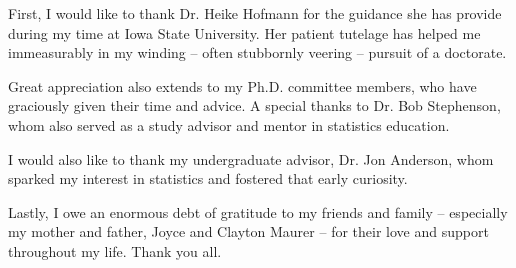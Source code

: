 
First, I would like to thank Dr. Heike Hofmann for the guidance she has provide during my time at Iowa State University. Her patient tutelage has helped me immeasurably in my winding -- often stubbornly veering -- pursuit of a doctorate. 

Great appreciation also extends to my Ph.D. committee members, who have graciously given their time and advice. A special thanks to Dr. Bob Stephenson, whom also served as a study advisor and mentor in statistics education. 

I would also like to thank my undergraduate advisor, Dr. Jon Anderson, whom sparked my interest in statistics and fostered that early curiosity. 

Lastly, I owe an enormous debt of gratitude to my friends and family -- especially my mother and father, Joyce and Clayton Maurer -- for their love and support throughout my life. Thank you all. 